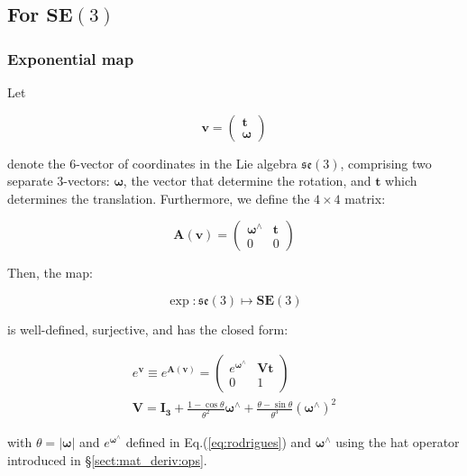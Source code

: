 \documentclass[a4paper,11pt]{report}
\newcommand{\W}{{\bm{\omega}}}
\newcommand{\hatop}[1]{#1^\wedge}
\begin{document}
\subsection{For $\mathbf{SE}(3)$}
\label{eq:exp.log.se3}

\subsubsection{Exponential map}
\label{sect:se3_exp}

Let

\begin{equation}
\label{eq:vector_in_se3}
\mathbf{v}= \left( \begin{array}{c} \mathbf{t} \\ \W \end{array} \right)
\end{equation}

\noindent denote the 6-vector of coordinates in
the Lie algebra $\mathfrak{se}(3)$,
comprising
two separate 3-vectors: $\W$, the vector that determine
the rotation, and $\mathbf{t}$ which determines the translation.
Furthermore, we define the $4 \times 4$ matrix:

\begin{equation}
 \mathbf{A}(\mathbf{v})=
\left(
\begin{array}{cc}
 \hatop{\W}  & \mathbf{t} \\
 0 & 0
\end{array}
\right)
\end{equation}


Then, the map:

\begin{equation}
  \exp: \mathfrak{se}(3) \mapsto \mathbf{SE}(3)
\end{equation}

\noindent is well-defined, surjective, and has the closed form:

\begin{eqnarray}
  e^ { \mathbf{v} } \equiv  e^ { \mathbf{A}(\mathbf{v}) } =
\left(
\begin{array}{cc}
  e^{\hatop{\W}} & \mathbf{V} \mathbf{t} \\
   0 & 1
\end{array}
\right)
\\
\label{eq:V_exp}
\mathbf{V} = \mathbf{I_3}
+ \frac{1-\cos \theta}{\theta^2} \hatop{\W}
+ \frac{\theta- \sin \theta}{\theta^3} (\hatop{\W})^2 
\end{eqnarray}

\noindent with $\theta = |\W|$ and $e^{\hatop{\W}}$
defined in Eq.(\ref{eq:rodrigues})
and $\hatop{\W}$ using the hat operator introduced in \S\ref{sect:mat_deriv:ops}.
\end{document}
